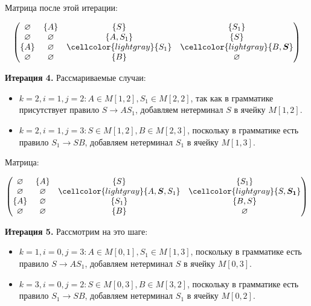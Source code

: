 \begin{example}
Матрица после этой итерации:

\[
\begin{pmatrix}
\varnothing & \{A\}       & \{S\}      & \{S_1\}     \\
\varnothing & \varnothing & \{A, S_1\} & \{S\}       \\
\{A\}       & \varnothing & \cellcolor{lightgray}\{S_1\}    & \cellcolor{lightgray}\{B, \boldsymbol{S}\}    \\
\varnothing & \varnothing & \{B\}      & \varnothing \\
\end{pmatrix}
\]

\textbf{Итерация 4.}
Рассмариваемые случаи:

\begin{itemize}
    \setlength\itemsep{1em}
    \item $k = 2, i = 1, j = 2: A \in M[1, 2], S_1 \in M[2, 2]$, так как в грамматике присутствует правило $S \to A S_1$, добавляем нетерминал $S$ в ячейку $M[1, 2]$.
    \item $k = 2, i = 1, j = 3: S \in M[1, 2], B \in M[2, 3]$, поскольку в грамматике есть правило $S_1 \to S B$, добавляем нетерминал $S_1$ в ячейку $M[1, 3]$.
\end{itemize}

Матрица:

\[
\begin{pmatrix}
\varnothing & \{A\}       & \{S\}         & \{S_1\}     \\
\varnothing & \varnothing & \cellcolor{lightgray}\{A, \boldsymbol{S}, S_1\} & \cellcolor{lightgray}\{S, \boldsymbol{S_1}\}  \\
\{A\}       & \varnothing & \{S_1\}       & \{B, S\}    \\
\varnothing & \varnothing & \{B\}         & \varnothing \\
\end{pmatrix}
\]

\textbf{Итерация 5.}
Рассмотрим на это шаге:

\begin{itemize}
    \setlength\itemsep{1em}
    \item $k = 1, i = 0, j = 3: A \in M[0, 1], S_1 \in M[1, 3]$, поскольку в грамматике есть правило $S \to A S_1$, добавляем нетерминал $S$ в ячейку $M[0, 3]$.
    \item $k = 3, i = 0, j = 2: S \in M[0, 3], B \in M[3, 2]$, поскольку в грамматике есть правило $S_1 \to S B$, добавляем нетерминал $S_1$ в ячейку $M[0, 2]$.
\end{itemize}


\end{example}
